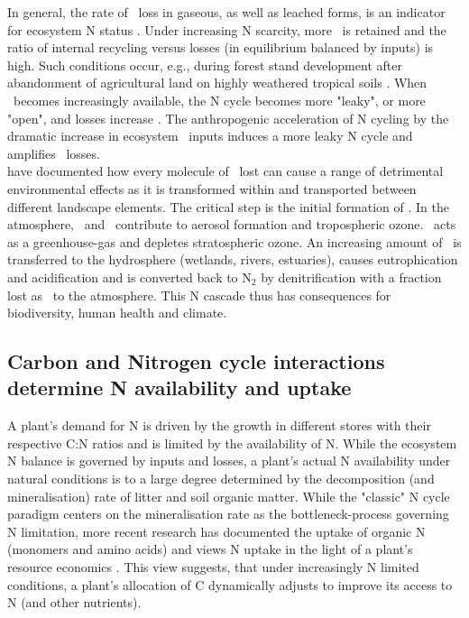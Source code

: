 In general, the rate of \nr\ loss in gaseous, as well as leached forms, is an indicator for ecosystem N status \citep{davidson07, ena}. Under increasing N scarcity, more \nr\ is retained and the ratio of internal recycling versus losses (in equilibrium balanced by inputs) is high. Such conditions occur, e.g., during forest stand development after abandonment of agricultural land on highly weathered tropical soils \citep{davidson07}. When \nr\ becomes increasingly available, the N cycle becomes more "leaky", or more "open", and losses increase \citep{barnard05}. The anthropogenic acceleration of N cycling by the dramatic increase in ecosystem \nr\ inputs induces a more leaky N cycle and amplifies \nr\ losses.\\

\citet{galloway03} have documented how every molecule of \nr\ lost can cause a range of detrimental environmental effects as it is transformed within and transported between different landscape elements. The critical step is the initial formation of \nr . In the atmosphere, \nox\ and \nhhh\ contribute to aerosol formation and tropospheric ozone. \nno\ acts as a greenhouse-gas and depletes stratospheric ozone. An increasing amount of \nr\ is transferred to the hydrosphere (wetlands, rivers, estuaries), causes eutrophication and acidification and is converted back to N$_2$ by denitrification with a fraction lost as \nno\ to the atmosphere. This N cascade thus has consequences for biodiversity, human health and climate.  

\subsection{Carbon and Nitrogen cycle interactions determine N availability and uptake}
\label{sec:cncoupling}
A plant's demand for N is driven by the growth in different stores with their respective C:N ratios and is limited by the availability of N. While the ecosystem N balance is governed by inputs and losses, a plant's actual N availability under natural conditions is to a large degree determined by the decomposition (and mineralisation) rate of litter and soil organic matter. While the "classic" N cycle paradigm centers on the mineralisation rate as the bottleneck-process governing N limitation, more recent research has documented the uptake of organic N (monomers and amino acids) \citep{nasholm98,schimel04,nasholm09} and views N uptake in the light of a plant's resource economics \citep{fisher10, phillips13}. This view suggests, that under increasingly N limited conditions, a plant's allocation of C dynamically adjusts to improve its access to N (and other nutrients). 
\\

